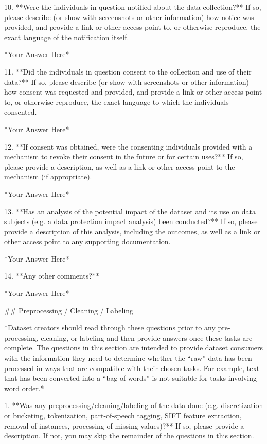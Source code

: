 10. **Were the individuals in question notified about the data collection?** If so, please describe (or show with screenshots or other information) how notice was provided, and provide a link or other access point to, or otherwise reproduce, the exact language of the notification itself.

	*Your Answer Here*

11. **Did the individuals in question consent to the collection and use of their data?** If so, please describe (or show with screenshots or other information) how consent was requested and provided, and provide a link or other access point to, or otherwise reproduce, the exact language to which the individuals consented.

	*Your Answer Here*

12. **If consent was obtained, were the consenting individuals provided with a mechanism to revoke their consent in the future or for certain uses?** If so, please provide a description, as well as a link or other access point to the mechanism (if appropriate).

	*Your Answer Here*

13. **Has an analysis of the potential impact of the dataset and its use on data subjects (e.g. a data protection impact analysis) been conducted?** If so, please provide a description of this analysis, including the outcomes, as well as a link or other access point to any supporting documentation.

	*Your Answer Here*

14. **Any other comments?**

	*Your Answer Here*


## Preprocessing / Cleaning / Labeling

*Dataset creators should read through these questions prior to any pre-processing, cleaning, or labeling and then provide answers once these tasks are complete. The questions in this section are intended to provide dataset consumers with the information they need to determine whether the “raw” data has been processed in ways that are compatible with their chosen tasks. For example, text that has been converted into a “bag-of-words” is not suitable for tasks involving word order.*

1. **Was any preprocessing/cleaning/labeling of the data done (e.g. discretization or bucketing, tokenization, part-of-speech tagging, SIFT feature extraction, removal of instances, processing of missing values)?** If so, please provide a description. If not, you may skip the remainder of the questions in this section.

